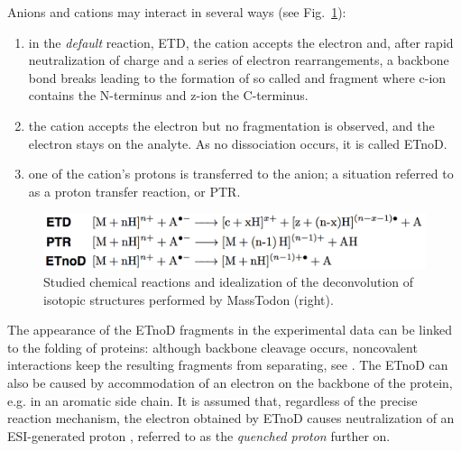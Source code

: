 \documentclass{llncs}
\begin{document}
Anions and cations may interact in several ways (see Fig.~\ref{img::reactions}):
\begin{enumerate}
        \item in the \textit{default} reaction, ETD, the cation accepts the electron and, after rapid neutralization of charge and a series of electron rearrangements, a backbone  bond breaks leading to the formation of so called  and  fragment where c-ion contains the N-terminus and z-ion the C-terminus.

        \item the cation accepts the electron but no fragmentation is observed, and the electron stays on the analyte. As no dissociation occurs, it is called ETnoD.

        \item one of the cation’s protons is transferred to the anion; a situation referred to as a proton transfer reaction, or PTR.
\end{enumerate}
\begin{figure}[h]\centering
        \includegraphics[width=.8\textwidth]{reactions.png}
        \caption{Studied chemical reactions  and
        idealization of the deconvolution of isotopic structures performed by {\sc MassTodon} (right).}\label{img::reactions}
\end{figure}



The appearance of the ETnoD fragments in the experimental data can be linked to the folding of proteins: although backbone cleavage occurs, noncovalent interactions keep the resulting fragments from separating, see \cite{Lermyte2014-vu,Lermyte2015-oy}. The ETnoD can also be caused by accommodation of an electron on the backbone of the protein, e.g. in an aromatic side chain. It is assumed that, regardless of the precise reaction mechanism, the electron obtained by ETnoD causes neutralization of an ESI-generated proton \cite{Lermyte2015-lm}, referred to as the \textit{quenched proton} further on.
\end{document}
